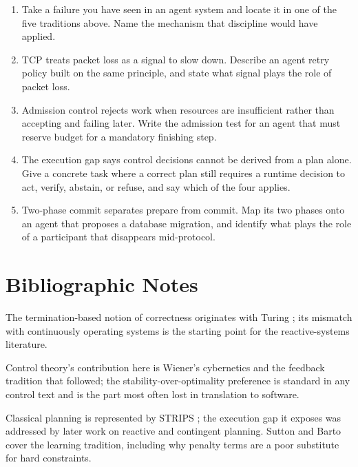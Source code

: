 \begin{enumerate}
\item Take a failure you have seen in an agent system and locate it in one of the
five traditions above. Name the mechanism that discipline would have applied.

\item TCP treats packet loss as a signal to slow down. Describe an agent retry
policy built on the same principle, and state what signal plays the role of
packet loss.

\item Admission control rejects work when resources are insufficient rather than
accepting and failing later. Write the admission test for an agent that must
reserve budget for a mandatory finishing step.

\item The execution gap says control decisions cannot be derived from a plan
alone. Give a concrete task where a correct plan still requires a runtime
decision to act, verify, abstain, or refuse, and say which of the four applies.

\item Two-phase commit separates prepare from commit. Map its two phases onto an
agent that proposes a database migration, and identify what plays the role of a
participant that disappears mid-protocol.
\end{enumerate}

\section*{Bibliographic Notes}

The termination-based notion of correctness originates with Turing
\cite{turing1936computable}; its mismatch with continuously operating systems is
the starting point for the reactive-systems literature.

Control theory's contribution here is Wiener's cybernetics \cite{wiener1948} and
the feedback tradition that followed; the stability-over-optimality preference is
standard in any control text and is the part most often lost in translation to
software.

Classical planning is represented by STRIPS \cite{fikes1971strips}; the execution
gap it exposes was addressed by later work on reactive and contingent planning.
Sutton and Barto \cite{sutton2018reinforcement} cover the learning tradition,
including why penalty terms are a poor substitute for hard constraints.

